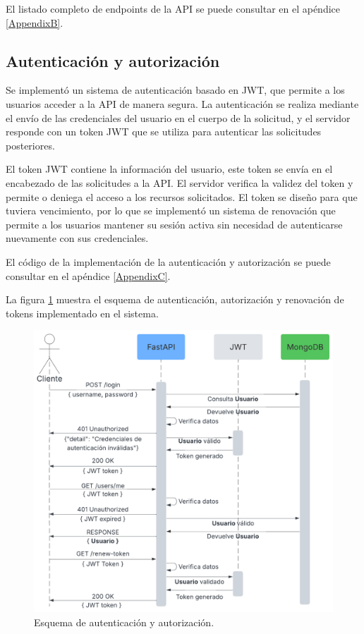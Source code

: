 El listado completo de endpoints de la API se puede consultar en el apéndice
\ref{AppendixB}.

\subsection{Autenticación y autorización}

Se implementó un sistema de autenticación basado en JWT, que permite a los
usuarios acceder a la API de manera segura. La autenticación se realiza
mediante el envío de las credenciales del usuario en el cuerpo de la solicitud,
y el servidor responde con un token JWT que se utiliza para autenticar las
solicitudes posteriores.

El token JWT contiene la información del usuario, este token se envía en el
encabezado de las solicitudes a la API. El servidor verifica la validez del
token y permite o deniega el acceso a los recursos solicitados. El token se
diseño para que tuviera vencimiento, por lo que se implementó un sistema de
renovación que permite a los usuarios mantener su sesión activa sin necesidad
de autenticarse nuevamente con sus credenciales.

El código de la implementación de la autenticación y autorización se puede
consultar en el apéndice \ref{AppendixC}.

La figura \ref{fig:esquema autenticacion} muestra el esquema de autenticación,
autorización y renovación de tokens implementado en el sistema.

\begin{figure}[H]
    \centering
    \includegraphics[width=.78\textwidth]{./Images/17.png}
    \caption{Esquema de autenticación y autorización.}
    \label{fig:esquema autenticacion}
\end{figure}

